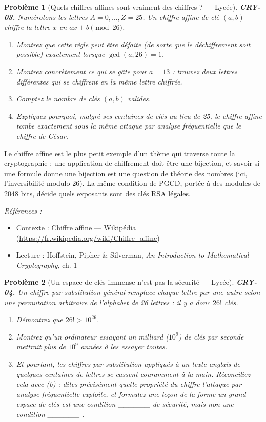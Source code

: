 \documentclass[11pt]{article}
\newtheorem{problem}{Problème}
\newenvironment{refs}{\par\small\noindent\emph{Références :}\begin{itemize}\setlength\itemsep{0pt}}{\end{itemize}\normalsize}
\begin{document}
\begin{problem}[{Quels chiffres affines sont vraiment des chiffres ? --- Lycée}]
\textbf{CRY-03.} Numérotons les lettres $A=0,\dots,Z=25$. Un
\textit{chiffre affine} de clé $(a,b)$ chiffre la lettre $x$ en
$ax+b \pmod{26}$.
\begin{enumerate}
\item[(a)] Montrez que cette règle peut être défaite (de sorte que le déchiffrement soit
possible) exactement lorsque $\gcd(a,26)=1$.
\item[(b)] Montrez concrètement ce qui se gâte pour
$a=13$ : trouvez deux lettres différentes qui se chiffrent en la même lettre chiffrée.
\item[(c)] Comptez le nombre de clés $(a,b)$ valides.
\item[(d)] Expliquez pourquoi, malgré ses centaines
de clés au lieu de 25, le chiffre affine tombe exactement sous la même attaque par analyse
fréquentielle que le chiffre de César.
\end{enumerate}

\end{problem}

\noindent Le chiffre affine est le plus petit exemple d'un thème qui traverse toute
la cryptographie : une application de chiffrement doit être une bijection, et savoir si une
formule donne une bijection est une question de théorie des nombres (ici, l'inversibilité
modulo 26). La même condition de PGCD, portée à des modules de 2048 bits, décide quels
exposants sont des clés RSA légales.

\begin{refs}
\item Contexte : Chiffre affine --- Wikipédia (\url{https://fr.wikipedia.org/wiki/Chiffre_affine})
\item Lecture : Hoffstein, Pipher \& Silverman, \textit{An Introduction to Mathematical Cryptography}, ch. 1
\end{refs}

\bigskip

\begin{problem}[{Un espace de clés immense n'est pas la sécurité --- Lycée}]
\textbf{CRY-04.} Un chiffre par substitution général remplace chaque
lettre par une autre selon une permutation arbitraire de l'alphabet de 26 lettres : il y a
donc $26!$ clés.
\begin{enumerate}
\item[(a)] Démontrez que $26! > 10^{26}$.
\item[(b)] Montrez qu'un ordinateur
essayant un milliard ($10^9$) de clés par seconde mettrait plus de $10^9$ années
à les essayer toutes.
\item[(c)] Et pourtant, les chiffres par substitution appliqués à un texte
anglais de quelques centaines de lettres se cassent couramment à la main. Réconciliez cela
avec (b) : dites précisément quelle propriété du chiffre l'attaque par analyse fréquentielle
exploite, et formulez une leçon de la forme \og{} un grand espace de clés est une condition
\_\_\_\_\_\_ de sécurité, mais non une condition \_\_\_\_\_\_ \fg{}.
\end{enumerate}

\end{problem}
\end{document}
